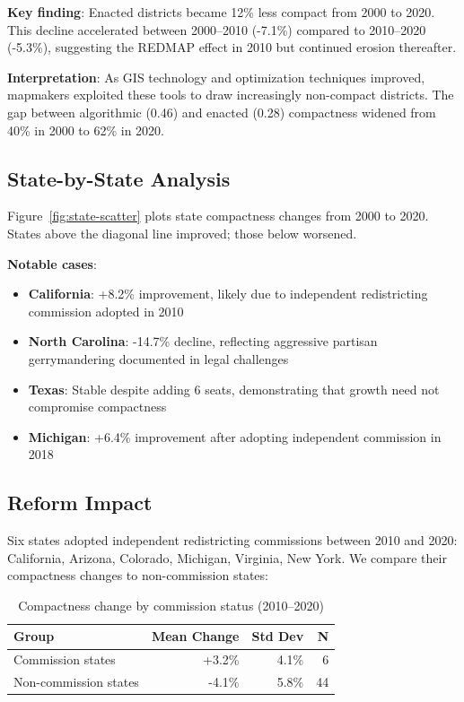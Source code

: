 \textbf{Key finding}: Enacted districts became 12\% less compact from 2000 to 2020. This decline accelerated between 2000--2010 (-7.1\%) compared to 2010--2020 (-5.3\%), suggesting the REDMAP effect in 2010 but continued erosion thereafter.

\textbf{Interpretation}: As GIS technology and optimization techniques improved, mapmakers exploited these tools to draw increasingly non-compact districts. The gap between algorithmic (0.46) and enacted (0.28) compactness widened from 40\% in 2000 to 62\% in 2020.

\subsection{State-by-State Analysis}

Figure~\ref{fig:state-scatter} plots state compactness changes from 2000 to 2020. States above the diagonal line improved; those below worsened.

\textbf{Notable cases}:
\begin{itemize}
    \item \textbf{California}: +8.2\% improvement, likely due to independent redistricting commission adopted in 2010
    \item \textbf{North Carolina}: -14.7\% decline, reflecting aggressive partisan gerrymandering documented in legal challenges
    \item \textbf{Texas}: Stable despite adding 6 seats, demonstrating that growth need not compromise compactness
    \item \textbf{Michigan}: +6.4\% improvement after adopting independent commission in 2018
\end{itemize}

\subsection{Reform Impact}

Six states adopted independent redistricting commissions between 2010 and 2020: California, Arizona, Colorado, Michigan, Virginia, New York. We compare their compactness changes to non-commission states:

\begin{table}[h]
\centering
\begin{tabular}{lrrr}
\toprule
\textbf{Group} & \textbf{Mean Change} & \textbf{Std Dev} & \textbf{N} \\
\midrule
Commission states    & +3.2\% & 4.1\% & 6 \\
Non-commission states & -4.1\% & 5.8\% & 44 \\
\bottomrule
\end{tabular}
\caption{Compactness change by commission status (2010--2020)}
\end{table}

